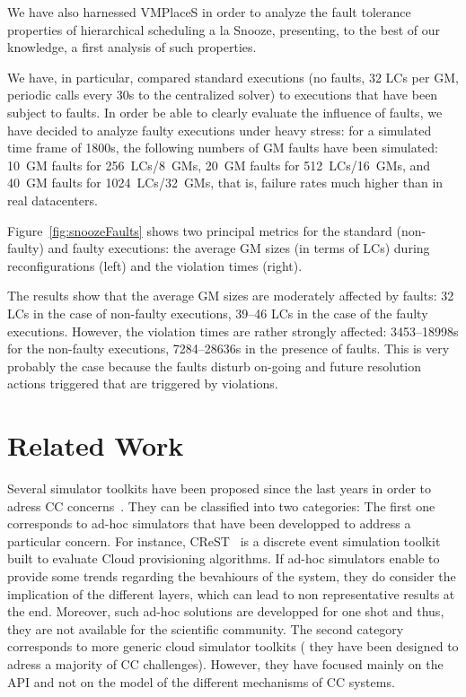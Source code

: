 We have also harnessed VMPlaceS in order to analyze the fault
tolerance properties of hierarchical scheduling a la Snooze,
presenting, to the best of our knowledge, a first analysis of such
properties.

We have, in particular, compared standard executions (no faults, 32
LCs per GM, periodic calls every 30s to the centralized solver) to
executions that have been subject to faults. In order be able to
clearly evaluate the influence of faults, we have decided to analyze
faulty executions under heavy stress: for a simulated time frame of
1800s, the following numbers of GM faults have been simulated: 10~GM
faults for 256~LCs/8~GMs, 20~GM faults for 512~LCs/16~GMs, and 40~GM
faults for 1024~LCs/32~GMs, that is, failure rates much higher than in
real datacenters.

Figure~\ref{fig:snoozeFaults} shows two principal metrics for the
standard (non-faulty) and faulty executions: the average GM sizes (in
terms of LCs) during reconfigurations (left) and the violation times
(right).

The results show that the average GM sizes are moderately affected by
faults: 32 LCs in the case of non-faulty executions, 39--46 LCs in the
case of the faulty executions. However, the violation times are rather
strongly affected: 3453--18998s for the non-faulty executions,
7284--28636s in the presence of faults. This is very probably the case
because the faults disturb on-going and future resolution actions
triggered that are triggered by violations.



\section{Related Work}
\label{sec:related}

Several simulator toolkits have been proposed since the last years in
order to adress CC concerns~\cite{CC13, DGSIM, cloudsim, icancloud,
  greencloud}.  They can be classified into two categories: The first
one corresponds to ad-hoc simulators that have been developped to
address a particular concern. For instance, CReST~\cite{CC13} is a
discrete event simulation toolkit built to evaluate Cloud provisioning
algorithms. If ad-hoc simulators enable to provide some trends
regarding the bevahiours of the system, they do consider the
implication of the different layers, which can lead to non
representative results at the end. Moreover, such ad-hoc solutions are
developped for one shot and thus, they are not available for the
scientific community. The second category \cite{icancloud, greencloud,
  cloudsim} corresponds to more generic cloud simulator toolkits (\ie
they have been designed to adress a majority of CC
challenges). However, they have focused mainly on the API and not on
the model of the different mechanisms of CC systems.

